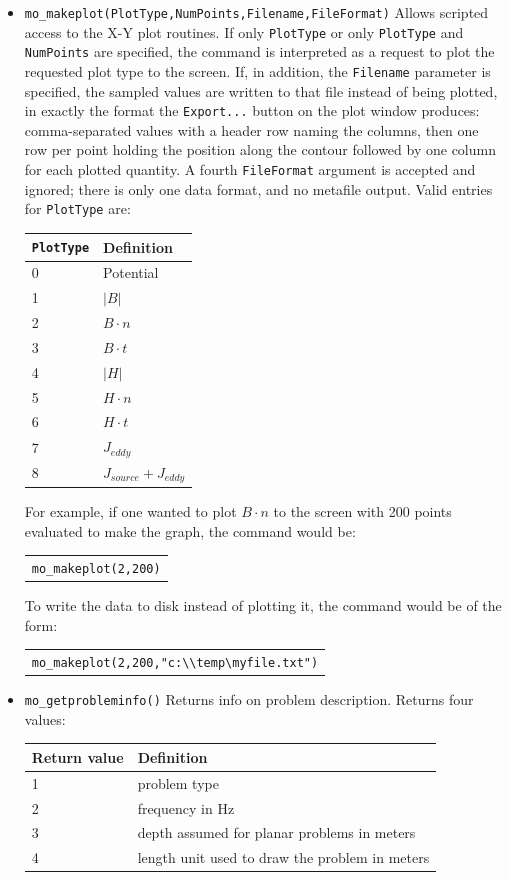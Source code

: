 \begin{itemize}
\item \verb+mo_makeplot(PlotType,NumPoints,Filename,FileFormat)+
Allows scripted access to the X-Y plot routines.  If only {\tt PlotType} or only {\tt PlotType}
and {\tt NumPoints} are specified, the command is interpreted as a request to plot the
requested plot type to the screen.  If, in addition, the {\tt Filename} parameter is specified,
the sampled values are written to that file instead of being plotted, in exactly the
format the {\tt Export...} button on the plot window produces: comma-separated values
with a header row naming the columns, then one row per point holding the position along
the contour followed by one column for each plotted quantity.  A fourth
{\tt FileFormat} argument is accepted and ignored; there is only one data format, and
no metafile output.
Valid entries for {\tt PlotType} are:
\begin{center}
\begin{tabular}{ll} \hline
{\tt PlotType} & Definition \\ \hline
0 & Potential \\
1 & $|B|$ \\
2 & $B \cdot n$ \\
3 & $B \cdot t$ \\
4 & $|H|$ \\
5 & $H \cdot n$ \\
6 & $H \cdot t$ \\
7 & $J_{eddy}$ \\
8 & $J_{source}+J_{eddy}$ \\
\hline
\end{tabular}
\end{center}
For example, if one wanted to plot $B \cdot n$ to the screen with 200 points evaluated to
make the graph, the command would be:

\begin{tabular}{l} {\tt mo\_makeplot(2,200)} \end{tabular}

To write the data to disk instead of plotting it, the command would
be of the form:

\begin{tabular}{l} \verb+mo_makeplot(2,200,"c:\\temp\myfile.txt")+ \end{tabular}

\item \verb+mo_getprobleminfo()+
Returns info on problem description.  Returns four values:
\begin{center}
\begin{tabular}{ll} \hline
Return value & Definition \\ \hline 
1 &  problem type  \\ 
2 &  frequency in Hz \\ 
3 &  depth assumed for planar problems in meters \\
4 &  length unit used to draw the problem in meters
\end{tabular}
\end{center}


\end{itemize}
